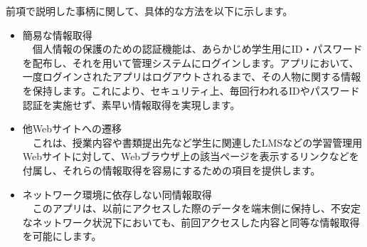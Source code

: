 前項で説明した事柄に関して、具体的な方法を以下に示します。
\begin{itemize}
\item 簡易な情報取得\\
　個人情報の保護のための認証機能は、あらかじめ学生用にID・パスワードを配布し、それを用いて管理システムにログインします。アプリにおいて、一度ログインされたアプリはログアウトされるまで、その人物に関する情報を保持します。これにより、セキュリティ上、毎回行われるIDやパスワード認証を実施せず、素早い情報取得を実現します。
\item 他Webサイトへの遷移\\
　これは、授業内容や書類提出先など学生に関連したLMSなどの学習管理用Webサイトに対して、Webブラウザ上の該当ページを表示するリンクなどを付属し、それらの情報取得を容易にするための項目を提供します。
\item ネットワーク環境に依存しない同情報取得\\
　このアプリは、以前にアクセスした際のデータを端末側に保持し、不安定なネットワーク状況下においても、前回アクセスした内容と同等な情報取得を可能にします。
\end{itemize}
